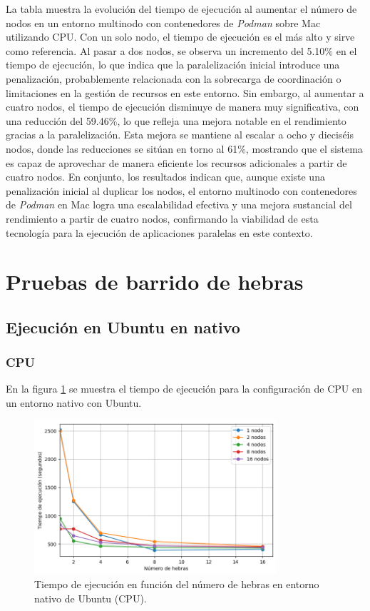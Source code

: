 La tabla muestra la evolución del tiempo de ejecución al aumentar el número de nodos en un entorno multinodo con contenedores de \textit{Podman} sobre Mac utilizando CPU. Con un solo nodo, el tiempo de ejecución es el más alto y sirve como referencia. Al pasar a dos nodos, se observa un incremento del 5.10\% en el tiempo de ejecución, lo que indica que la paralelización inicial introduce una penalización, probablemente relacionada con la sobrecarga de coordinación o limitaciones en la gestión de recursos en este entorno. Sin embargo, al aumentar a cuatro nodos, el tiempo de ejecución disminuye de manera muy significativa, con una reducción del 59.46\%, lo que refleja una mejora notable en el rendimiento gracias a la paralelización. Esta mejora se mantiene al escalar a ocho y dieciséis nodos, donde las reducciones se sitúan en torno al 61\%, mostrando que el sistema es capaz de aprovechar de manera eficiente los recursos adicionales a partir de cuatro nodos. En conjunto, los resultados indican que, aunque existe una penalización inicial al duplicar los nodos, el entorno multinodo con contenedores de \textit{Podman} en Mac logra una escalabilidad efectiva y una mejora sustancial del rendimiento a partir de cuatro nodos, confirmando la viabilidad de esta tecnología para la ejecución de aplicaciones paralelas en este contexto.

\section{Pruebas de barrido de hebras}
\subsection{Ejecución en Ubuntu en nativo}
\subsubsection{CPU}

En la figura \ref{fig:thread_sweep_ubuntu_cpu_native_time} se muestra el tiempo de ejecución para la configuración de CPU en un entorno nativo con Ubuntu.

\begin{figure}[H]
    \centering
    \includegraphics[width=0.8\textwidth]{imagenes/cap5/thread_sweep_ubuntu_cpu_native_time.png}
    \caption{Tiempo de ejecución en función del número de hebras en entorno nativo de Ubuntu (CPU).}
    \label{fig:thread_sweep_ubuntu_cpu_native_time}
\end{figure}

